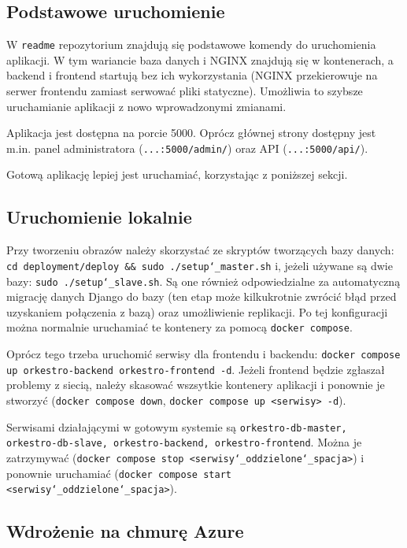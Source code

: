 \documentclass[11pt,a4paper]{article}
\renewcommand{\_}{\char`_}
\begin{document}
\subsection{Podstawowe uruchomienie}

W \texttt{readme} repozytorium znajdują się podstawowe komendy do uruchomienia aplikacji. W tym wariancie baza danych i NGINX znajdują się w kontenerach, a backend i frontend startują bez ich wykorzystania (NGINX przekierowuje na serwer frontendu zamiast serwować pliki statyczne). Umożliwia to szybsze uruchamianie aplikacji z nowo wprowadzonymi zmianami.

Aplikacja jest dostępna na porcie 5000. Oprócz głównej strony dostępny jest m.in. panel administratora (\texttt{...:5000/admin/}) oraz API (\texttt{...:5000/api/}).

Gotową aplikację lepiej jest uruchamiać, korzystając z poniższej sekcji.

\subsection{Uruchomienie lokalnie}

Przy tworzeniu obrazów należy skorzystać ze skryptów tworzących bazy danych: \texttt{cd deployment/deploy \&\& sudo ./setup\_master.sh} i, jeżeli używane są dwie bazy: \texttt{sudo ./setup\_slave.sh}. Są one również odpowiedzialne za automatyczną migrację danych Django do bazy (ten etap może kilkukrotnie zwrócić błąd przed uzyskaniem połączenia z bazą) oraz umożliwienie replikacji. Po tej konfiguracji można normalnie uruchamiać te kontenery za pomocą \texttt{docker compose}.

Oprócz tego trzeba uruchomić serwisy dla frontendu i backendu: \texttt{docker compose up orkestro-backend orkestro-frontend -d}. Jeżeli frontend będzie zgłaszał problemy z siecią, należy skasować wszsytkie kontenery aplikacji i ponownie je stworzyć (\texttt{docker compose down}, \texttt{docker compose up <serwisy> -d}).

Serwisami działającymi w gotowym systemie są \texttt{orkestro-db-master, orkestro-db-slave, orkestro-backend, orkestro-frontend}. Można je zatrzymywać (\texttt{docker compose stop <serwisy\_oddzielone\_spacja>}) i ponownie uruchamiać (\texttt{docker compose start <serwisy\_oddzielone\_spacja>}).

\subsection{Wdrożenie na chmurę Azure}
\end{document}
